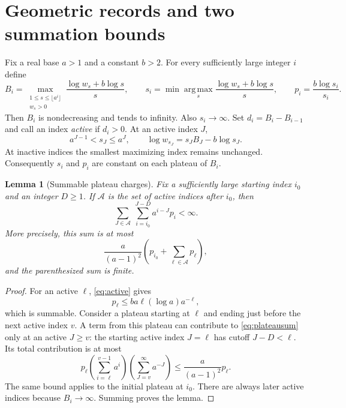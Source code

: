 \documentclass[11pt]{amsart}
\newtheorem{lemma}[theorem]{Lemma}
\theoremstyle{remark}\newtheorem{remark}[theorem]{Remark}
\begin{document}
\section{Geometric records and two summation bounds}\label{sec:records}
Fix a real base $a>1$ and a constant $b>2$. For every sufficiently large
integer $i$ define
\begin{equation}\label{eq:records}
 B_i=\max_{\substack{1\le s\le\lfloor a^i\rfloor\\w_s>0}}
       \frac{\log w_s+b\log s}{s},\qquad
 s_i=\min\operatorname*{arg\,max}_{s}\frac{\log w_s+b\log s}{s},
 \qquad p_i=\frac{b\log s_i}{s_i}.
\end{equation}
Then $B_i$ is nondecreasing and tends to infinity. Also $s_i\to\infty$.
Set $d_i=B_i-B_{i-1}$ and call an index \emph{active} if $d_i>0$. At an
active index $J$,
\begin{equation}\label{eq:active}
 a^{J-1}<s_J\le a^J,\qquad
 \log w_{s_J}=s_JB_J-b\log s_J.
\end{equation}
At inactive indices the smallest maximizing index remains unchanged.
Consequently $s_i$ and $p_i$ are constant on each plateau of $B_i$.

\begin{lemma}[Summable plateau charges]\label{lem:plateau}
Fix a sufficiently large starting index $i_0$ and an integer $D\ge1$.
If $\mathcal A$ is the set of active indices after $i_0$, then
\begin{equation}\label{eq:plateausum}
 \sum_{J\in\mathcal A}\ \sum_{i=i_0}^{J-D} a^{i-J}p_i<\infty.
\end{equation}
More precisely, this sum is at most
\[
 \frac{a}{(a-1)^2}
 \left(p_{i_0}+\sum_{\ell\in\mathcal A}p_\ell\right),
\]
and the parenthesized sum is finite.
\end{lemma}

\begin{proof}
For an active $\ell$, \eqref{eq:active} gives
\[
 p_\ell\le ba\ell(\log a)a^{-\ell},
\]
which is summable. Consider a plateau starting at $\ell$ and ending just
before the next active index $v$. A term from this plateau can contribute
to \eqref{eq:plateausum} only at an active $J\ge v$: the starting active
index $J=\ell$ has cutoff $J-D<\ell$. Its total contribution is at most
\[
 p_\ell
 \left(\sum_{i=\ell}^{v-1}a^i\right)
 \left(\sum_{J=v}^{\infty}a^{-J}\right)
 \le \frac{a}{(a-1)^2}p_\ell.
\]
The same bound applies to the initial plateau at $i_0$. There are always
later active indices because $B_i\to\infty$. Summing proves the lemma.
\end{proof}
\end{document}
